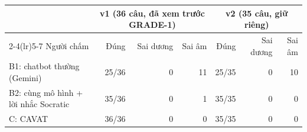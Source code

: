 \small
\begin{tabular}{@{}lrrrrrr@{}}
\toprule
 & \multicolumn{3}{c}{v1 (36 câu, đã xem trước GRADE-1)} & \multicolumn{3}{c}{v2 (35 câu, giữ riêng)} \\
\cmidrule(lr){2-4}\cmidrule(lr){5-7}
Người chấm & Đúng & Sai dương & Sai âm & Đúng & Sai dương & Sai âm \\
\midrule
B1: chatbot thường (Gemini) & 25/36 & 0 & 11 & 25/35 & 0 & 10 \\
B2: cùng mô hình + lời nhắc Socratic & 35/36 & 0 & 1 & 35/35 & 0 & 0 \\
C: CAVAT & 36/36 & 0 & 0 & 35/35 & 0 & 0 \\
\bottomrule
\end{tabular}

